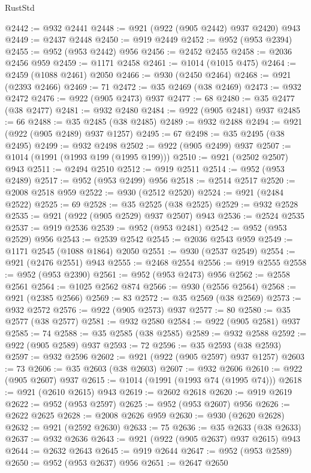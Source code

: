 \begin{lexlean}{RustStd}
\begin{coremodule}
@2442 := @932 @2441
@2448 := @921 (@922 (@905 @2442) @937 @2420) @943
@2449 := @2437 @2448
@2450 := @919 @2449
@2452 := @952 (@953 @2394)
@2455 := @952 (@953 @2442) @956
@2456 := @2452 @2455
@2458 := @2036 @2456 @959
@2459 := @1171 @2458
@2461 := @1014 (@1015 @475)
@2464 := @2459 (@1088 @2461) @2050
@2466 := @930 (@2450 @2464)
@2468 := @921 (@2393 @2466)
@2469 := 71
@2472 := @35 @2469 (@38 @2469)
@2473 := @932 @2472
@2476 := @922 (@905 @2473) @937
@2477 := 68
@2480 := @35 @2477 (@38 @2477)
@2481 := @932 @2480
@2484 := @922 (@905 @2481) @937
@2485 := 66
@2488 := @35 @2485 (@38 @2485)
@2489 := @932 @2488
@2494 := @921 (@922 (@905 @2489) @937 @1257)
@2495 := 67
@2498 := @35 @2495 (@38 @2495)
@2499 := @932 @2498
@2502 := @922 (@905 @2499) @937
@2507 := @1014 (@1991 (@1993 @199 (@1995 @199)))
@2510 := @921 (@2502 @2507) @943
@2511 := @2494 @2510
@2512 := @919 @2511
@2514 := @952 (@953 @2489)
@2517 := @952 (@953 @2499) @956
@2518 := @2514 @2517
@2520 := @2008 @2518 @959
@2522 := @930 (@2512 @2520)
@2524 := @921 (@2484 @2522)
@2525 := 69
@2528 := @35 @2525 (@38 @2525)
@2529 := @932 @2528
@2535 := @921 (@922 (@905 @2529) @937 @2507) @943
@2536 := @2524 @2535
@2537 := @919 @2536
@2539 := @952 (@953 @2481)
@2542 := @952 (@953 @2529) @956
@2543 := @2539 @2542
@2545 := @2036 @2543 @959
@2549 := @1171 @2545 (@1088 @1864) @2050
@2551 := @930 (@2537 @2549)
@2554 := @921 (@2476 @2551) @943
@2555 := @2468 @2554
@2556 := @919 @2555
@2558 := @952 (@953 @2390)
@2561 := @952 (@953 @2473) @956
@2562 := @2558 @2561
@2564 := @1025 @2562 @874
@2566 := @930 (@2556 @2564)
@2568 := @921 (@2385 @2566)
@2569 := 83
@2572 := @35 @2569 (@38 @2569)
@2573 := @932 @2572
@2576 := @922 (@905 @2573) @937
@2577 := 80
@2580 := @35 @2577 (@38 @2577)
@2581 := @932 @2580
@2584 := @922 (@905 @2581) @937
@2585 := 74
@2588 := @35 @2585 (@38 @2585)
@2589 := @932 @2588
@2592 := @922 (@905 @2589) @937
@2593 := 72
@2596 := @35 @2593 (@38 @2593)
@2597 := @932 @2596
@2602 := @921 (@922 (@905 @2597) @937 @1257)
@2603 := 73
@2606 := @35 @2603 (@38 @2603)
@2607 := @932 @2606
@2610 := @922 (@905 @2607) @937
@2615 := @1014 (@1991 (@1993 @74 (@1995 @74)))
@2618 := @921 (@2610 @2615) @943
@2619 := @2602 @2618
@2620 := @919 @2619
@2622 := @952 (@953 @2597)
@2625 := @952 (@953 @2607) @956
@2626 := @2622 @2625
@2628 := @2008 @2626 @959
@2630 := @930 (@2620 @2628)
@2632 := @921 (@2592 @2630)
@2633 := 75
@2636 := @35 @2633 (@38 @2633)
@2637 := @932 @2636
@2643 := @921 (@922 (@905 @2637) @937 @2615) @943
@2644 := @2632 @2643
@2645 := @919 @2644
@2647 := @952 (@953 @2589)
@2650 := @952 (@953 @2637) @956
@2651 := @2647 @2650

\end{coremodule}
\end{lexlean}
